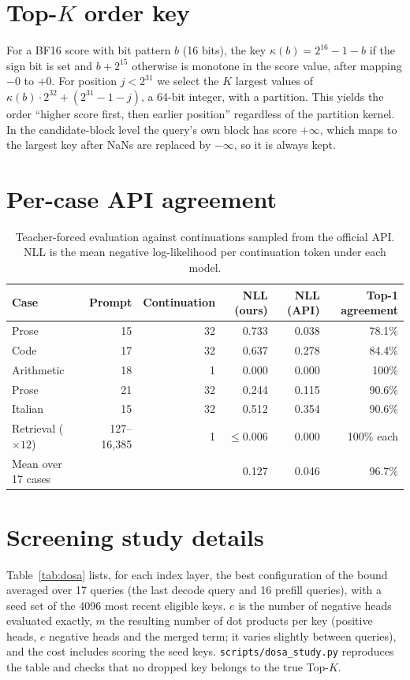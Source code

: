 \section{Top-$K$ order key}
\label{app:order}
For a BF16 score with bit pattern $b$ (16 bits), the key $\kappa(b) = 2^{16}-1-b$ if the sign bit is set and $b+2^{15}$ otherwise is monotone in the score value, after mapping $-0$ to $+0$. For position $j<2^{31}$ we select the $K$ largest values of $\kappa(b)\cdot2^{32} + (2^{31}-1-j)$, a 64-bit integer, with a partition. This yields the order ``higher score first, then earlier position'' regardless of the partition kernel. In the candidate-block level the query's own block has score $+\infty$, which maps to the largest key after NaNs are replaced by $-\infty$, so it is always kept.

\section{Per-case API agreement}
\label{app:api}
\begin{table}[h]
\centering
\small
\caption{Teacher-forced evaluation against continuations sampled from the official API. NLL is the mean negative log-likelihood per continuation token under each model.}
\label{tab:api}
\begin{tabular}{@{}lrrrrr@{}}
\toprule
Case & Prompt & Continuation & NLL (ours) & NLL (API) & Top-1 agreement \\
\midrule
Prose & 15 & 32 & 0.733 & 0.038 & 78.1\% \\
Code & 17 & 32 & 0.637 & 0.278 & 84.4\% \\
Arithmetic & 18 & 1 & 0.000 & 0.000 & 100\% \\
Prose & 21 & 32 & 0.244 & 0.115 & 90.6\% \\
Italian & 15 & 32 & 0.512 & 0.354 & 90.6\% \\
Retrieval ($\times12$) & 127--16{,}385 & 1 & $\le$0.006 & 0.000 & 100\% each \\
\midrule
Mean over 17 cases & & & 0.127 & 0.046 & 96.7\% \\
\bottomrule
\end{tabular}
\end{table}

\section{Screening study details}
\label{app:dosa}
Table~\ref{tab:dosa} lists, for each index layer, the best configuration of the bound averaged over 17 queries (the last decode query and 16 prefill queries), with a seed set of the 4096 most recent eligible keys. $e$ is the number of negative heads evaluated exactly, $m$ the resulting number of dot products per key (positive heads, $e$ negative heads and the merged term; it varies slightly between queries), and the cost includes scoring the seed keys. \texttt{scripts/dosa\_study.py} reproduces the table and checks that no dropped key belongs to the true Top-$K$.

